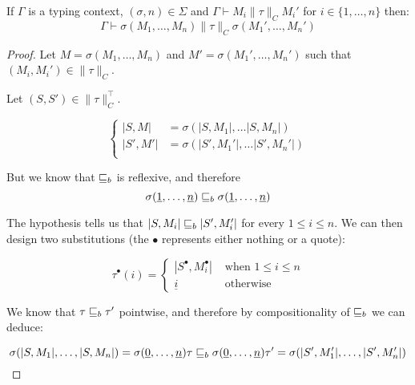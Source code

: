 \begin{alemma}
    If $\Gamma$ is a typing context, $(\sigma,n) \in \Sigma$
    and $\Gamma \vdash M_i \| \tau \|_C M_i'$ for $i \in \{ 1, \dots, n\}$
    then:
    \begin{equation*}
        \Gamma \vdash \sigma(M_1, \dots, M_n) \| \tau \|_C \sigma(M_1', \dots,
        M_n')
    \end{equation*}
\end{alemma}
\begin{proof}
        Let $M = \sigma (M_1, \dots, M_n)$ 
        and $M' = \sigma (M_1', \dots, M_n')$
        such that $(M_i,M_i') \in \| \tau \|_C$.

        Let $(S,S') \in \| \tau \|_C^\top$.

        \begin{equation*}
            \begin{cases}
                |S,M|   &= \sigma (|S,M_1|, \dots |S,M_n|) \\
                |S',M'| &= \sigma (|S',M_1'|, \dots |S',M_n'|) \\
            \end{cases}
        \end{equation*}

        But we know that $\sqsubseteq_b$ is reflexive, and 
        therefore
        \begin{equation*}
            \sigma(\underline{1}, \dots, \underline{n})
            \sqsubseteq_b \sigma(\underline{1}, \dots, \underline{n})
        \end{equation*}

        The hypothesis tells us that $|S,M_i| \sqsubseteq_b |S',M_i'|$
        for every $1 \leq i \leq n$. We can then design
        two substitutions (the $\bullet$ represents either 
        nothing or a quote):

        \begin{equation*}
            \tau^\bullet (i) = \begin{cases}
                |S^\bullet, M_i^\bullet| & \text{ when } 1 \leq i \leq n \\
                \underline{i}            & \text{ otherwise } 
            \end{cases}
        \end{equation*}

        We know that $\tau \sqsubseteq_b \tau'$ pointwise, and therefore
        by compositionality of $\sqsubseteq_b$ we can deduce:

        \begin{equation*}
            \sigma (|S,M_1|, \dots, |S,M_n|)
            = \sigma(\underline{0}, \dots, \underline{n}) \tau
            \sqsubseteq_b
             \sigma(\underline{0}, \dots, \underline{n}) \tau'
            =
            \sigma (|S',M_1'|, \dots, |S',M_n'|)
        \end{equation*}
\end{proof}

